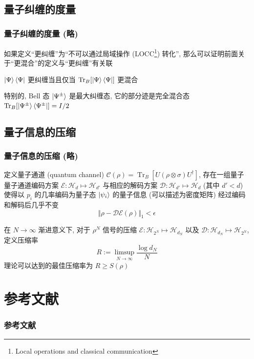 \documentclass[12pt,hyperref={CJKbookmarks=true}]{beamer}
\newcommand{\Tr}{\operatorname{Tr}}
\begin{document}
\subsection{量子纠缠的度量} %
\label{sub:measure_entanglement}
\begin{frame}
    \frametitle{量子纠缠的度量 (略)}
    如果定义``更纠缠''为``不可以通过局域操作 
    (LOCC\footnote{Local operations and classical communication}) 
    转化'', 那么可以证明前面关于``更混合''的定义与``更纠缠''有关联
    \begin{theorem}
        $\ket\Psi\bra\Psi$ 更纠缠当且仅当 $\Tr_B[\ket\Psi\bra\Psi]$ 更混合
    \end{theorem}
    特别的, Bell 态 $\ket{\Psi^\pm}$ 是最大纠缠态, 
    它的部分迹是完全混合态 $\Tr_B[\ket{\Psi^\pm}\bra{\Psi^\pm}] = I/2$
\end{frame}
\subsection{量子信息的压缩} %
\label{sub:Quantum_compression}
\begin{frame}[allowframebreaks]
    \frametitle{量子信息的压缩 (略)}
    定义量子通道 (quantum channel) $\mathscr C(\rho) = \Tr_B[U(\rho\otimes\sigma)U^\dagger]$, 
    存在一组量子量子通道编码方案 $\mathscr E:\mathcal H_d\mapsto\mathcal H_{d'}$ 
    与相应的解码方案 $\mathscr D:\mathcal H_{d'}\mapsto\mathcal H_d$ (其中 $d'<d$)
    使得以 $p_i$ 的几率编码为量子态 $\ket{\psi_i}$ 的量子信息 (可以描述为密度矩阵)
    经过编码和解码后几乎不变
    $$
    \Vert\rho - \mathscr D\mathscr E(\rho)\Vert_1<\epsilon
    $$
    \begin{theorem}
        在 $N\to\infty$ 渐进意义下, 对于 $\rho^N$ 信号的压缩
        $\mathscr E:\mathcal H_{2^N}\mapsto\mathcal H_{d_N}$ 以及
        $\mathscr D:\mathcal H_{d_N}\mapsto\mathcal H_{2^N}$, 定义压缩率
        \begin{equation}
            R := \limsup_{N\to\infty}\frac{\log d_N}{N}
        \end{equation}
        理论可以达到的最佳压缩率为 $R\ge S(\rho)$\cite{noisecodeing.PhysRevA.51.2738}
    \end{theorem}
\end{frame}
\section{参考文献} %
\label{sec:参考文献}
\begin{frame}[allowframebreaks]
    \frametitle{参考文献}
    
    
\end{frame}
\end{document}

